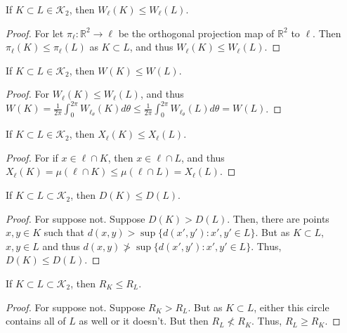 \documentclass[crop=false,class=book,oneside]{standalone}
\begin{document}
            \begin{theorem}
            If $K\subset L \in \mathscr{K}_2$, then $W_{\ell}(K) \leq W_{\ell}(L)$.
            \end{theorem}
            \begin{proof}
            For let $\pi_{\ell}:\mathbb{R}^2 \rightarrow \ell$ be the orthogonal projection map of $\mathbb{R}^2$ to $\ell$. Then $\pi_{\ell}(K)\leq \pi_{\ell}(L)$ as $K\subset L$, and thus $W_{\ell}(K)\leq W_{\ell}(L)$.
            \end{proof}
            \begin{theorem}
            If $K\subset L\in \mathscr{K}_2$, then $W(K)\leq W(L)$.
            \end{theorem}
            \begin{proof}
            For $W_{\ell}(K)\leq W_{\ell}(L)$, and thus $W(K)=\frac{1}{2\pi}\int_{0}^{2\pi}W_{\ell_{\theta}}(K)d\theta \leq \frac{1}{2\pi}\int_{0}^{2\pi}W_{\ell_{\theta}}(L)d\theta=W(L)$.
            \end{proof}
            \begin{theorem}
            If $K\subset L\in \mathscr{K}_2$, then $X_{\ell}(K)\leq X_{\ell}(L)$.
            \end{theorem}
            \begin{proof}
            For if $x\in \ell\cap K$, then $x\in \ell\cap L$, and thus $X_{\ell}(K)=\mu(\ell\cap K) \leq \mu(\ell\cap L)=X_{\ell}(L)$.
            \end{proof}
            \begin{theorem}
            If $K\subset L\subset \mathscr{K}_2$, then $D(K)\leq D(L)$.
            \end{theorem}
            \begin{proof}
            For suppose not. Suppose $D(K)>D(L)$. Then, there are points $x,y\in K$ such that $d(x,y)> \sup\{d(x',y'):x',y'\in L\}$. But as $K\subset L$, $x,y\in L$ and thus $d(x,y) \not> \sup\{d(x',y'):x',y'\in L\}$. Thus, $D(K)\leq D(L)$.
            \end{proof}
            \begin{theorem}
            If $K\subset L \subset \mathscr{K}_2$, then $R_K\leq R_L$.
            \end{theorem}
            \begin{proof}
            For suppose not. Suppose $R_K>R_L$. But as $K\subset L$, either this circle contains all of $L$ as well or it doesn't. But then $R_L \not<R_K$. Thus, $R_L\geq R_K$.
            \end{proof}
\end{document}
